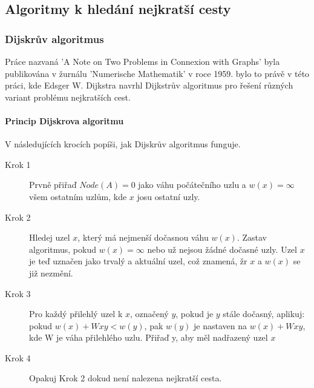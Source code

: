\documentclass[thesis=M,czech]{FITthesis}[2019/12/23]
\theoremstyle{plain}
\theoremstyle{definition}
\begin{document}



\subsection{Algoritmy k hledání nejkratší cesty}


\subsubsection{Dijskrův algoritmus}\label{dijskra}

Práce nazvaná 'A Note on Two Problems in Connexion with Graphs' byla publikována v žurnálu 'Numerische Mathematik' v roce 1959. bylo to právě v této práci, kde Edsger W. Dijkstra navrhl Dijkstrův algoritmus pro řešení  různých variant problému nejkratších cest.

\paragraph{Princip Dijskrova algoritmu}

V následujících krocích popíši, jak Dijskrův algoritmus funguje.
\begin{description}
\item [Krok 1]
Prvně přiřaď $Node(A) = 0$ jako váhu počátečního uzlu a $w(x) = \infty$ všem ostatním uzlům, kde $x$ josu ostatní uzly.
\item[Krok 2]
Hledej uzel $x$, který má nejmenší dočasnou váhu $w(x)$. Zastav algoritmus, pokud $w(x) = \infty$ nebo už nejsou žádné dočasné uzly. Uzel $x$ je teď uznačen jako trvalý a aktuální uzel, což znamená, žr $x$ a $w(x)$ se již nezmění.   
\item[Krok 3]
Pro každý přilehlý uzel k $x$, označený $y$, pokud je $y$ stále dočasný, aplikuj: 
pokud $w(x) + Wxy < w(y)$, pak $w(y)$ je nastaven na $w(x) + Wxy$, kde W je váha přilehlého uzlu. Přiřaď y, aby měl nadřazený uzel $x$
\item[Krok 4]
Opakuj Krok 2 dokud není nalezena nejkratší cesta. 
\end{description}
\end{document}
